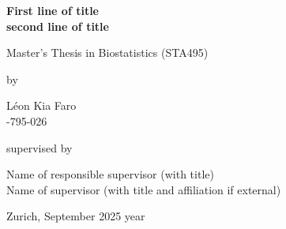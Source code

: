 \renewcommand\familydefault{\sfdefault} 


\thispagestyle{empty}
\renewcommand{\baselinestretch}{1.5}\normalfont
\begin{center}
\setlength{\parindent}{0cm}
\bf\Large%
First line of title \\
second line of title
\normalfont



\hrulefill

\vspace*{4cm}

\large
Master’s Thesis in Biostatistics (STA495) 
\vspace*{12mm}

by

\vspace*{12mm}

Léon Kia Faro\\
-795-026\\
\normalfont
\vspace*{4cm}

supervised by

\vspace*{1cm}

Name of responsible supervisor (with title)\\
Name of supervisor (with title and affiliation if external)

\vfill

Zurich, September 2025 year
\end{center}
\renewcommand\familydefault{\rmdefault}%
\renewcommand{\baselinestretch}{1.0}\rm 
\setcounter{page}{0}
\newpage
\vspace*{12cm}~\thispagestyle{empty}
\newpage
